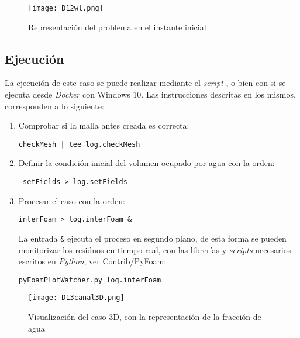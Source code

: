 \begin{figure}
\centering
\texttt{[image: D12wl.png]}
\caption{Representación del problema en el instante inicial}
\label{fig:D12wl}
\end{figure}

\subsection{Ejecución}\label{header-n149}

La ejecución de este caso se puede realizar mediante el \emph{script} ,
o bien con si se ejecuta desde \emph{Docker} con Windows 10. Las
instrucciones descritas en los mismos, corresponden a lo siguiente:

\begin{enumerate}
\def\labelenumi{\arabic{enumi}.}
\item
  Comprobar si la malla antes creada es correcta:

\begin{verbatim}
checkMesh | tee log.checkMesh
\end{verbatim}
\item
  Definir la condición inicial del volumen ocupado por agua con la
  orden:

\begin{verbatim}
 setFields > log.setFields
\end{verbatim}
\item
  Procesar el caso con la orden:

\begin{verbatim}
interFoam > log.interFoam &
\end{verbatim}

  La entrada \texttt{\&} ejecuta el proceso en segundo plano, de esta
  forma se pueden monitorizar los residuos en tiempo real, con las
  librerías y \emph{scripts} necesarios escritos en \emph{Python}, ver
  \href{https://openfoamwiki.net/index.php/Contrib/PyFoam\#Runner-Utilities}{Contrib/PyFoam}:

\begin{verbatim}
pyFoamPlotWatcher.py log.interFoam
\end{verbatim}
\end{enumerate}

\begin{figure}
\centering
\texttt{[image: D13canal3D.png]}
\caption[Visualización del caso 3D]{Visualización del caso 3D, con la representación de la fracción de agua}
\label{fig:D13canal3D}
\end{figure}

